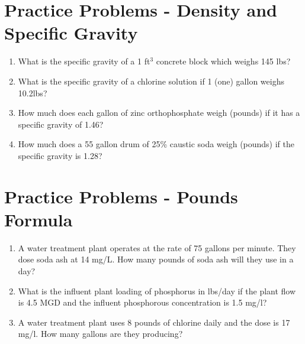 \vspace{1cm}
\section*{Practice Problems - Density and Specific Gravity}
\begin{enumerate}

\item What is the specific gravity of a 1 ft$^3$ concrete block which weighs 145 lbs?

\item What is the specific gravity of a chlorine solution if 1 (one) gallon weighs 10.2lbs?

\item How much does each gallon of zinc orthophosphate weigh (pounds) if it has a specific gravity of 1.46?

\item How much does a 55 gallon drum of 25\% caustic soda weigh (pounds) if the specific gravity is 1.28?

\end{enumerate}



\section*{Practice Problems - Pounds Formula}
\begin{enumerate}

\item A water treatment plant operates at the rate of 75 gallons per minute. They dose soda ash at 14 mg/L. How many pounds of soda ash will they use in a day?
\item What is the influent plant loading of phosphorus in lbs/day if the plant flow is 4.5 MGD and the influent phosphorous concentration is 1.5 mg/l?\\
\item A water treatment plant uses 8 pounds of chlorine daily and the dose is 17 mg/l. How
many gallons are they producing?
\end{enumerate}

